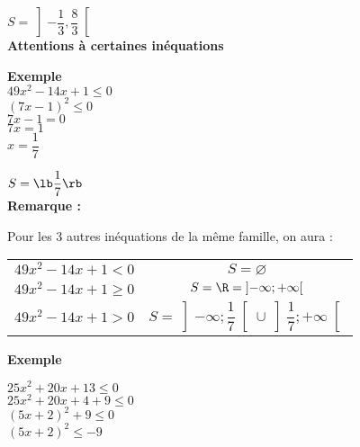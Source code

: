 $ S = \left]-\dfrac{1}{3}, \dfrac{8}{3} \right[ $ \\

\textbf{Attentions à certaines inéquations}

\textbf{Exemple }\\

$ 49x^2 - 14x + 1 \leqslant 0 $\\

$ \left(7x-1\right)^2 \leqslant 0 $ \\

$ 7x - 1 = 0 $\\

$ 7x = 1 $\\

$ x = \dfrac{1}{7} $


$ S = \lb \dfrac{1}{7} \rb $ \\

\textbf{Remarque :}

Pour les 3 autres inéquations de la même famille, on aura :

\begin{tabular}{cc}
$49x^2 - 14x + 1 < 0$ & $S = \varnothing$ \\
$49x^2 - 14x + 1 \geqslant 0$& $ S = \R = \left]-\infty ; +\infty\right[$ \\
$49x^2 - 14x + 1 > 0$ & $ S = \left]-\infty ; \dfrac{1}{7} \right[\cup \left]\dfrac{1}{7}; +\infty\right[ $ \\
\end{tabular}

\newpage 

\textbf{Exemple } 

$ 25x^2 + 20x + 13 \leqslant 0 $\\

$ 25x^2 + 20x + 4 + 9 \leqslant 0 $\\

$ \left(5x + 2\right)^2 + 9 \leqslant 0 $\\

$ \left(5x + 2\right)^2 \leqslant - 9 $\\

